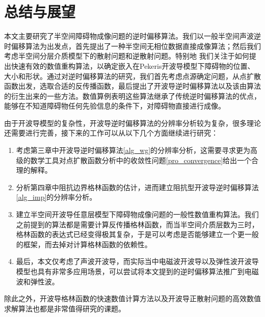
\chapter{总结与展望}\label{chap:summary}

本文主要研究了半空间障碍物成像问题的逆时偏移算法。我们以一般半空间声波逆时偏移算法为出发点，首先提出了一种半空间无相位数据直接成像算法；然后我们考虑半空间分层介质模型下的散射问题和逆散射问题。特别地 我们关注于如何提出快速有效的数值重构算法，以确定嵌入在Pekeris开波导模型下障碍物的位置、大小和形状。通过对逆时偏移算法的研究，我们首先考虑点源确定问题，从点扩散函数出发，选取合适的反传播函数，最后提出了开波导逆时偏移算法以及该由算法的衍生出来的一些方法。数值算例表明这些算法继承了传统逆时偏移算法的优点，能够在不知道障碍物任何先验信息的条件下，对障碍物直接进行成像。

由于开波导模型的复杂性，开波导逆时偏移算法的分辨率分析较为复杂，很多理论还需要进行完善，接下来的工作可以从以下几个方面继续进行研究：
\begin{enumerate}
  \item 考虑第三章中开波导逆时偏移算法\ref{alg_wg}的分辨率分析，这需要寻求更为高级的数学工具对点扩散函数分析中的收敛性问题\ref{pro_convergence}给出一个合理的解释。
  \item 分析第四章中阻抗边界格林函数的估计，进而建立阻抗型开波导逆时偏移算法\ref{alg_imp}的分辨率分析。
  \item 建立半空间开波导任意层模型下障碍物成像问题的一般性数值重构算法。我们之前提到的算法都是需要计算反传播格林函数，而当半空间介质层数为三时，格林函数的表达式已经变得极其复杂，于是可以考虑是否能够建立一个更一般的框架，而去掉对计算格林函数的依赖性。
  \item 最后，本文仅考虑了声波开波导，而实际当中电磁波开波导以及弹性波开波导模型也具有非常多应用场景，可以尝试将本文提到的逆时偏移算法推广到电磁波和弹性波。
\end{enumerate}

除此之外，开波导格林函数的快速数值计算方法以及开波导正散射问题的高效数值求解算法也都是非常值得研究的课题。
